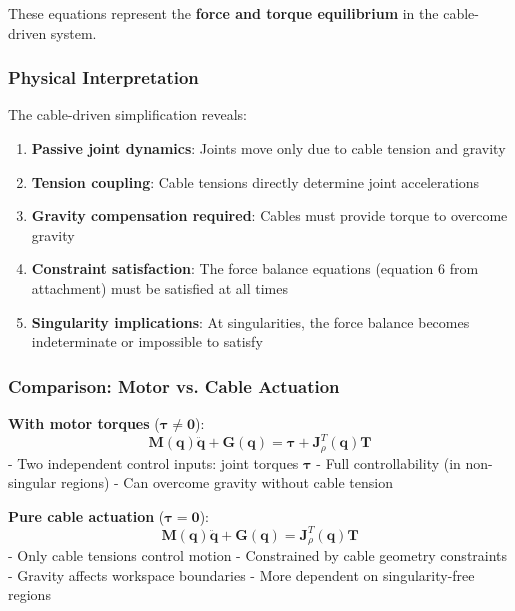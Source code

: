 These equations represent the \textbf{force and torque equilibrium} in the cable-driven system.

\subsubsection{Physical Interpretation}

The cable-driven simplification reveals:

\begin{enumerate}
    \item \textbf{Passive joint dynamics}: Joints move only due to cable tension and gravity
    
    \item \textbf{Tension coupling}: Cable tensions directly determine joint accelerations
    
    \item \textbf{Gravity compensation required}: Cables must provide torque to overcome gravity
    
    \item \textbf{Constraint satisfaction}: The force balance equations (equation 6 from attachment) must be satisfied at all times
    
    \item \textbf{Singularity implications}: At singularities, the force balance becomes indeterminate or impossible to satisfy
\end{enumerate}

\subsubsection{Comparison: Motor vs. Cable Actuation}

\textbf{With motor torques} ($\boldsymbol{\tau} \neq \mathbf{0}$):
\begin{equation}
\mathbf{M}(\mathbf{q}) \ddot{\mathbf{q}} + \mathbf{G}(\mathbf{q}) = \boldsymbol{\tau} + \mathbf{J}_{\rho}^T(\mathbf{q}) \mathbf{T}
\end{equation}
- Two independent control inputs: joint torques $\boldsymbol{\tau}$
- Full controllability (in non-singular regions)
- Can overcome gravity without cable tension

\textbf{Pure cable actuation} ($\boldsymbol{\tau} = \mathbf{0}$):
\begin{equation}
\mathbf{M}(\mathbf{q}) \ddot{\mathbf{q}} + \mathbf{G}(\mathbf{q}) = \mathbf{J}_{\rho}^T(\mathbf{q}) \mathbf{T}
\end{equation}
- Only cable tensions control motion
- Constrained by cable geometry constraints
- Gravity affects workspace boundaries
- More dependent on singularity-free regions

